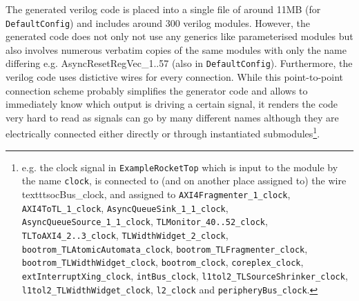 \documentclass[journal,a4paper]{IEEEtran}
\begin{document}
The generated verilog code is placed into a single file of around 11MB (for \texttt{DefaultConfig}) and includes around 300 verilog modules.
However, the generated code does not only not use any generics like parameterised modules but also involves numerous verbatim copies of the same modules with only the name differing e.g. AsyncResetRegVec\_1..57 (also in \texttt{DefaultConfig}).
Furthermore, the verilog code uses distictive wires for every connection.
While this point-to-point connection scheme probably simplifies the generator code and allows to immediately know which output is driving a certain signal, it renders the code very hard to read as signals can go by many different names although they are electrically connected either directly or through instantiated submodules\footnote{e.g. the clock signal in \texttt{ExampleRocketTop} which is input to the module by the name \texttt{clock}, is connected to (and on another place assigned to) the wire texttt{socBus\_clock}, and assigned to \texttt{AXI4Fragmenter\_1\_clock}, \texttt{AXI4ToTL\_1\_clock}, \texttt{AsyncQueueSink\_1\_1\_clock}, \texttt{AsyncQueueSource\_1\_1\_clock}, \texttt{TLMonitor\_40..52\_clock}, \texttt{TLToAXI4\_2..3\_clock}, \texttt{TLWidthWidget\_2\_clock}, \texttt{bootrom\_TLAtomicAutomata\_clock}, \texttt{bootrom\_TLFragmenter\_clock}, \texttt{bootrom\_TLWidthWidget\_clock}, \texttt{bootrom\_clock}, \texttt{coreplex\_clock}, \texttt{extInterruptXing\_clock}, \texttt{intBus\_clock}, \texttt{l1tol2\_TLSourceShrinker\_clock}, \texttt{l1tol2\_TLWidthWidget\_clock}, \texttt{l2\_clock} and \texttt{peripheryBus\_clock}.}.



\end{document}
